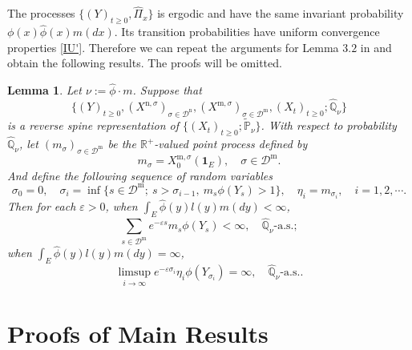 \documentclass[12pt,a4paper]{amsart}
\numberwithin{equation}{section}
\theoremstyle{plain}
\newtheorem{lem}[thm]{Lemma}
\theoremstyle{definition}
\theoremstyle{remark}
\begin{document}
The processes  $\{(Y)_{t\geq 0}, \widehat{\Pi}_x\}$ is ergodic and have the same invariant probability $\phi(x)\hat\phi(x)m(dx)$.
	Its transition probabilities have uniform convergence properties \eqref{IU'}.
	Therefore we can repeat the arguments for Lemma $3.2$ in \cite{LiuRenSong2009Llog} and obtain the following results. The proofs will be omitted.
\begin{lem}\label{import lemma}
	Let $\nu := \hat \phi \cdot m$.
	Suppose that \[\{(Y)_{t\geq 0}, (X^{\mathrm n, \sigma})_{\sigma\in \mathcal D^\mathrm n}, (X^{\mathrm m, \sigma})_{\sigma \in \mathcal D^\mathrm m}, (X_t)_{t\geq 0}; \widehat{\mathbb Q}_{\nu}\}\] is a reverse spine representation of $\{(X_t)_{t\geq 0}; \widetilde {\mathbb P}_\nu\}$.
	With respect to probability $\widehat{\mathbb Q}_\nu$, let $(m_\sigma)_{\sigma\in \mathcal D^{\mathrm m}}$ be the $\mathbb R^+$-valued point process defined by
\[
	m_\sigma
	= X^{\mathrm m, \sigma}_0(\mathbf 1_E),
	\quad \sigma \in \mathcal D^{\mathrm m}.
\]
And define the following sequence of random variables
\[
	\sigma_0=0,\quad \sigma_i=\inf\{s\in\mathcal D^{\mathrm m};\ s>\sigma_{i-1},\ m_s\phi(Y_s)>1\}, \quad\eta_i=m_{\sigma_i},\quad i=1,2,\cdots.
\]
Then for each $\varepsilon>0$, when $\int_E\widehat{\phi}(y)l(y)m(dy)<\infty$,
\[
	\sum_{s\in\mathcal D^{\mathrm m}} e^{-\varepsilon s}m_s\phi(Y_s)
	< \infty,
	\quad \widehat{\mathbb Q}_{\nu}\text{-a.s.};
\]
when $ \int_E\widehat{\phi}(y)l(y)m(dy)=\infty$,
\[
	\limsup_{i\rightarrow\infty} e^{-\varepsilon\sigma_i}\eta_i \phi(Y_{\sigma_i})
	=\infty,
	\quad \widehat{\mathbb Q}_{\nu}\text{-a.s.}.
\]
\end{lem}
\section{Proofs of Main Results}
\end{document}
